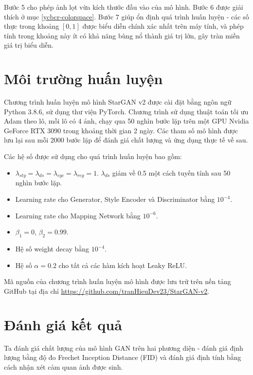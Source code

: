 \documentclass[12pt]{extreport}
\begin{document}
Bước 5 cho phép ảnh lọt vừa kích thước đầu vào của mô hình. Bước 6 được giải thích ở mục \ref{ycbcr-colorspace}. Bước 7 giúp ổn định quá trình huấn luyện - các số thực trong khoảng $ [0, 1] $ được biểu diễn chính xác nhất trên máy tính, và phép tính trong khoảng này ít có khả năng bùng nổ thành giá trị lớn, gây tràn miền giá trị biểu diễn.

\section{Môi trường huấn luyện}

Chương trình huấn luyện mô hình StarGAN v2 được cài đặt bằng ngôn ngữ Python 3.8.6, sử dụng thư viện PyTorch. Chương trình sử dụng thuật toán tối ưu Adam theo lô, mỗi lô có 4 ảnh, chạy qua 50 nghìn bước lặp trên một GPU Nvidia GeForce RTX 3090 trong khoảng thời gian 2 ngày. Các tham số mô hình được lưu lại sau mỗi 2000 bước lặp để đánh giá chất lượng và ứng dụng thực tế về sau.

Các hệ số được sử dụng cho quá trình huấn luyện bao gồm:
\begin{itemize}
    \item $ \lambda_{sty} = \lambda_{ds} = \lambda_{cyc} = \lambda_{reg} = 1 $. $ \lambda_{ds} $ giảm về 0.5 một cách tuyến tính sau 50 nghìn bước lặp.
    \item Learning rate cho Generator, Style Encoder và Discriminator bằng $ 10^{-4} $.
    \item Learning rate cho Mapping Network bằng $ 10^{-6} $.
    \item $ \beta_1 = 0 $, $ \beta_2 = 0.99 $.
    \item Hệ số weight decay bằng $ 10^{-4} $.
    \item Hệ số $ \alpha = 0.2 $ cho tất cả các hàm kích hoạt Leaky ReLU.
\end{itemize}

Mã nguồn của chương trình huấn luyện mô hình được lưu trữ trên nền tảng GitHub tại địa chỉ \href{https://github.com/tranHieuDev23/StarGAN-v2}{https://github.com/tranHieuDev23/StarGAN-v2}.

\section{Đánh giá kết quả}

Ta đánh giá chất lượng của mô hình GAN trên hai phương diện - đánh giá định lượng bằng độ đo Frechet Inception Distance (FID) và đánh giá định tính bằng cách nhận xét cảm quan ảnh được sinh.
\end{document}
